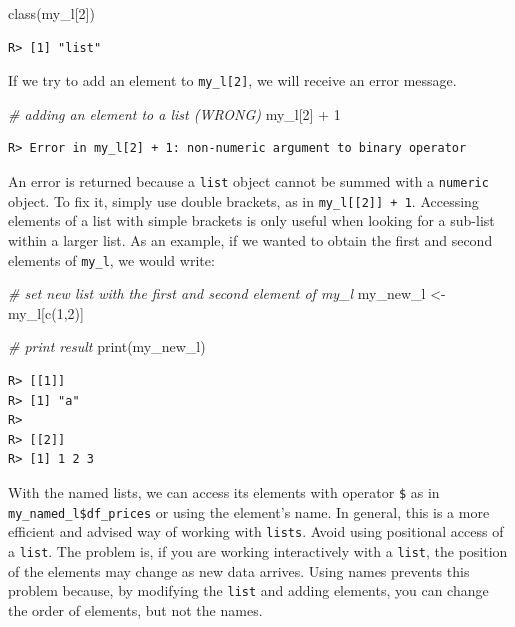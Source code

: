 \documentclass[
  12pt,
]{book}
\newenvironment{Shaded}{\begin{snugshade}}{\end{snugshade}}
\newcommand{\CommentTok}[1]{\textcolor[rgb]{0.37,0.37,0.37}{\textit{#1}}}
\newcommand{\DecValTok}[1]{\textcolor[rgb]{0.06,0.06,0.06}{#1}}
\newcommand{\FunctionTok}[1]{\textcolor[rgb]{0,0,0}{#1}}
\newcommand{\NormalTok}[1]{#1}
\newcommand{\OtherTok}[1]{\textcolor[rgb]{0.37,0.37,0.37}{#1}}
\newcommand{\SpecialCharTok}[1]{\textcolor[rgb]{0,0,0}{#1}}
\begin{document}
\begin{Shaded}
\begin{Highlighting}[]
\FunctionTok{class}\NormalTok{(my\_l[}\DecValTok{2}\NormalTok{])}
\end{Highlighting}
\end{Shaded}

\begin{verbatim}
R> [1] "list"
\end{verbatim}

If we try to add an element to \texttt{my\_l{[}2{]}}, we will receive an error message.

\begin{Shaded}
\begin{Highlighting}[]
\CommentTok{\# adding an element to a list (WRONG)}
\NormalTok{my\_l[}\DecValTok{2}\NormalTok{] }\SpecialCharTok{+} \DecValTok{1}
\end{Highlighting}
\end{Shaded}

\begin{verbatim}
R> Error in my_l[2] + 1: non-numeric argument to binary operator
\end{verbatim}

An error is returned because a \texttt{list} object cannot be summed with a \texttt{numeric} object. To fix it, simply use double brackets, as in \texttt{my\_l{[}{[}2{]}{]}\ +\ 1}. Accessing elements of a list with simple brackets is only useful when looking for a sub-list within a larger list. As an example, if we wanted to obtain the first and second elements of \texttt{my\_l}, we would write:

\begin{Shaded}
\begin{Highlighting}[]
\CommentTok{\# set new list with the first and second element of my\_l}
\NormalTok{my\_new\_l }\OtherTok{\textless{}{-}}\NormalTok{ my\_l[}\FunctionTok{c}\NormalTok{(}\DecValTok{1}\NormalTok{,}\DecValTok{2}\NormalTok{)]}

\CommentTok{\# print result}
\FunctionTok{print}\NormalTok{(my\_new\_l)}
\end{Highlighting}
\end{Shaded}

\begin{verbatim}
R> [[1]]
R> [1] "a"
R> 
R> [[2]]
R> [1] 1 2 3
\end{verbatim}

With the named lists, we can access its elements with operator \texttt{\$} as in \texttt{my\_named\_l\$df\_prices} or using the element's name. In general, this is a more efficient and advised way of working with \texttt{lists}. Avoid using positional access of a \texttt{list}. The problem is, if you are working interactively with a \texttt{list}, the position of the elements may change as new data arrives. Using names prevents this problem because, by modifying the \texttt{list} and adding elements, you can change the order of elements, but not the names.
\end{document}
